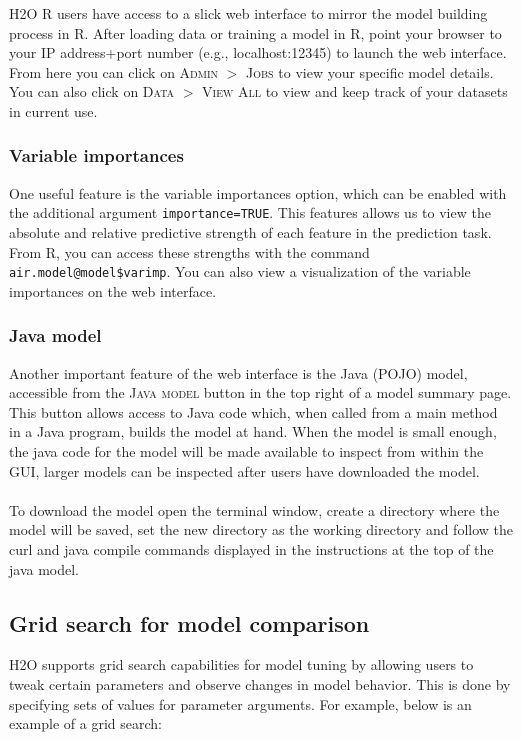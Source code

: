 \documentclass[11pt]{article}
\begin{document}
H2O R users have access to a slick web interface to mirror the model building process in R. After loading data or training a model in R, point your browser to your IP address+port number (e.g., localhost:12345) to launch the web interface. From here you can click on \textsc{Admin} $>$ \textsc{Jobs} to view your specific model details. You can also click on \textsc{Data} $>$ \textsc{View All} to view and keep track of your datasets in current use. 

\subsubsection{Variable importances} \label{3.3.1}

One useful feature is the variable importances option, which can be enabled with the additional argument \texttt{importance=TRUE}. This features allows us to view the absolute and relative predictive strength of each feature in the prediction task. From R, you can access these strengths with the command \texttt{air.model@model\$varimp}. You can also view a visualization of the variable
importances on the web interface.

\subsubsection{Java model} \label{3.3.2}

Another important feature of the web interface is the Java (POJO) model, accessible from the \textsc{Java model} button in the top right of a model summary page. This button allows access to Java code which, when called from a main method in a Java program, builds the model at hand. When the model is small enough, the java code for the model will be made available to inspect from within the GUI, larger models can be inspected after users have downloaded the model.
\\
\\
To download the model open the terminal window, create a directory where the model will be saved, set the new directory as the working directory and follow the curl and java compile commands displayed in the instructions at the top of the java model.

\subsection{Grid search for model comparison} \label{3.4}

H2O supports grid search capabilities for model tuning by allowing users to tweak certain parameters and observe changes in model behavior. This is done by specifying sets of values for parameter arguments. For example, below is an example of a grid search:
\end{document}
